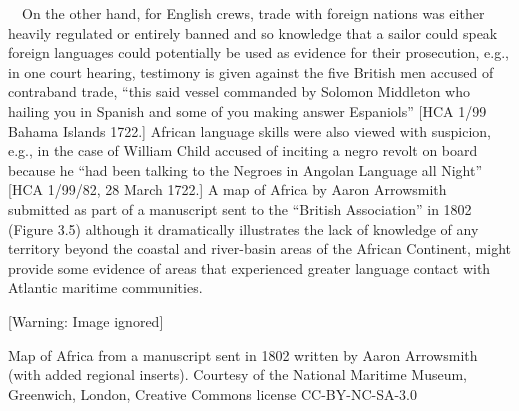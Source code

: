 \begin{styleStandard}
\ \ On the other hand, for English crews, trade with foreign nations was either heavily regulated or entirely banned and so knowledge that a sailor could speak foreign languages could potentially be used as evidence for their prosecution, e.g., in one court hearing, testimony is given against the five British men accused of contraband trade, “this said vessel commanded by Solomon Middleton who hailing you in Spanish and some of you making answer Espaniols” [HCA 1/99 Bahama Islands 1722.] African language skills were also viewed with suspicion, e.g., in the case of William Child accused of inciting a negro revolt on board because he “had been talking to the Negroes in Angolan Language all Night” [HCA 1/99/82, 28 March 1722.] A map of Africa by Aaron Arrowsmith submitted as part of a manuscript sent to the “British Association” in 1802 (Figure 3.5) although it dramatically illustrates the lack of knowledge of any territory beyond the coastal and river-basin areas of the African Continent, might provide some evidence of areas that experienced greater language contact with Atlantic maritime communities. 
\end{styleStandard}


\begin{styleStandard}

\end{styleStandard}


\begin{center}
 [Warning: Image ignored] %

\end{center}
\begin{styleStandard}
Map of Africa from a manuscript sent in 1802 written by Aaron Arrowsmith (with added regional inserts). Courtesy of the National Maritime Museum, Greenwich, London, Creative Commons license CC-BY-NC-SA-3.0
\end{styleStandard}


